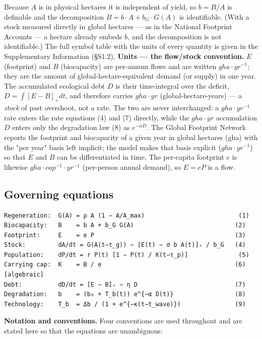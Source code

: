 \documentclass[11pt]{article}
\begin{document}
Because $A$ is in physical hectares it is independent of yield, so $b = B/A$ is definable and the decomposition $B = b\cdot{}A + b_{G}\cdot{}G(A)$ is identifiable. (With a stock measured directly in global hectares — as in the National Footprint Accounts — a hectare already embeds $b$, and the decomposition is not identifiable.) The full symbol table with the units of every quantity is given in the Supplementary Information (§S1.2). \textbf{Units — the flow/stock convention.} $E$ (footprint) and $B$ (biocapacity) are per-annum flows and are written $gha\cdot{}yr^{-1}$; they are the amount of global-hectare-equivalent demand (or supply) in one year. The accumulated ecological debt $D$ is their time-integral over the deficit, $D = \int{}[E - B]_{+} dt$, and therefore carries $gha\cdot{}yr$ (global-hectare-years) — a \emph{stock} of past overshoot, not a rate. The two are never interchanged: a $gha\cdot{}yr^{-1}$ rate enters the rate equations (4) and (7) directly, while the $gha\cdot{}yr$ accumulation $D$ enters only the degradation law (8) as $e^{-\alpha{}D}$. The Global Footprint Network reports the footprint and biocapacity of a given year in global hectares (gha) with the "per year" basis left implicit; the model makes that basis explicit ($gha\cdot{}yr^{-1}$) so that $E$ and $B$ can be differentiated in time. The per-capita footprint $e$ is likewise $gha\cdot{}cap^{-1}\cdot{}yr^{-1}$ (per-person annual demand), so $E = eP$ is a flow.

\subsection{Governing equations}

\begingroup\small\begin{verbatim}
Regeneration:  G(A) = ρ A (1 − A/A_max)                          (1)
Biocapacity:   B    = b A + b_G G(A)                            (2)
Footprint:     E    = e P                                       (3)
Stock:         dA/dt = G(A(t−τ_g)) − [E(t) − σ b A(t)]₊ / b_G   (4)
Population:    dP/dt = r P(t) [1 − P(t) / K(t−τ_p)]              (5)
Carrying cap:  K    = B / e                                     (6)   [algebraic]
Debt:          dD/dt = [E − B]₊ − η D                           (7)
Degradation:   b    = (b₀ + T_b(t)) e^{−α D(t)}                 (8)
Technology:    T_b  = Δb / (1 + e^{−κ(t−t_wave)})               (9)
\end{verbatim}\endgroup

\textbf{Notation and conventions.} Four conventions are used throughout and are stated here so that the equations are unambiguous:
\end{document}
